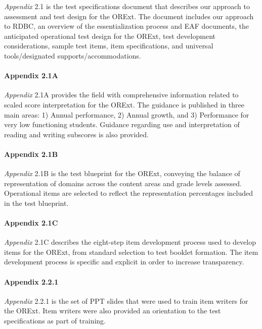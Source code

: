 \documentclass[]{article}
\let\oldparagraph\paragraph
\renewcommand{\paragraph}[1]{\oldparagraph{#1}\mbox{}}
\begin{document}
\emph{Appendix} 2.1 is the test specifications document that describes
our approach to assessment and test design for the ORExt. The document
includes our approach to RDBC, an overview of the essentialization
process and EAF documents, the anticipated operational test design for
the ORExt, test development considerations, sample test items, item
specifications, and universal tools/designated supports/accommodations.

\paragraph{Appendix 2.1A}\label{appendix-2.1a}

\emph{Appendix} 2.1A provides the field with comprehensive information
related to scaled score interpretation for the ORExt. The guidance is
published in three main areas: 1) Annual performance, 2) Annual growth,
and 3) Performance for very low functioning students. Guidance regarding
use and interpretation of reading and writing subscores is also
provided.

\paragraph{Appendix 2.1B}\label{appendix-2.1b}

\emph{Appendix} 2.1B is the test blueprint for the ORExt, conveying the
balance of representation of domains across the content areas and grade
levels assessed. Operational items are selected to reflect the
representation percentages included in the test blueprint.

\paragraph{Appendix 2.1C}\label{appendix-2.1c}

\emph{Appendix} 2.1C describes the eight-step item development process
used to develop items for the ORExt, from standard selection to test
booklet formation. The item development process is specific and explicit
in order to increase transparency.

\paragraph{Appendix 2.2.1}\label{appendix-2.2.1}

\emph{Appendix} 2.2.1 is the set of PPT slides that were used to train
item writers for the ORExt. Item writers were also provided an
orientation to the test specifications as part of training.
\end{document}
